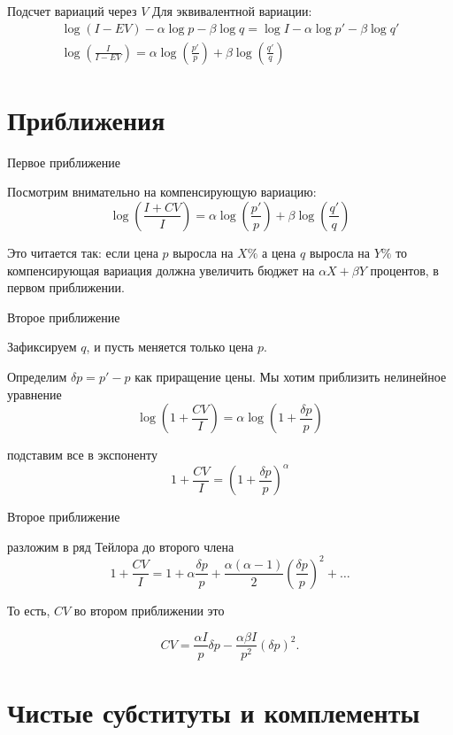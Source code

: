 \documentclass{beamer}
\begin{document}
\begin{frame}{Подсчет вариаций через $V$}
Для эквивалентной вариации:
\begin{gather*}
 \log (I - EV) - \alpha \log p - \beta \log q = \log I - \alpha \log p' - \beta \log q'\\
 \log(\frac{I}{I - EV}) = \alpha \log (\frac{p'}{p}) + \beta \log (\frac{q'}{q})
\end{gather*}

\end{frame}

\section{Приближения}

\begin{frame}{Первое приближение}

Посмотрим внимательно на компенсирующую вариацию:
$$\log(\frac{I+CV}{I}) = \alpha \log (\frac{p'}{p}) + \beta \log (\frac{q'}{q})$$

Это читается так: если цена $p$ выросла на $X \%$ а цена $q$ выросла на $Y \%$ то компенсирующая вариация должна увеличить бюджет на $\alpha X + \beta Y$ процентов, в первом приближении.

\end{frame}

\begin{frame}{Второе приближение}

Зафиксируем $q$, и пусть меняется только цена $p$.

Определим $\delta p = p'-p$ как приращение цены. Мы хотим приблизить нелинейное уравнение
$$\log(1 + \frac{CV}{I}) = \alpha \log (1 + \frac{\delta p}{p})$$

подставим все в экспоненту
$$1 + \frac{CV}{I} = (1 + \frac{\delta p}{p})^{\alpha}$$
\end{frame}

\begin{frame}{Второе приближение}

разложим в ряд Тейлора до второго члена
$$1 + \frac{CV}{I} = 1 + \alpha \frac{\delta p}{p} + \frac{\alpha(\alpha-1)}{2} (\frac{\delta p}{p})^2 + \ldots$$

То есть, $CV$ во втором приближении это

$$CV = \frac{\alpha I}{p} \delta p - \frac{ \alpha \beta I}{p^2} (\delta p)^2.$$
\end{frame}

\section{Чистые субституты и комплементы}
\end{document}
